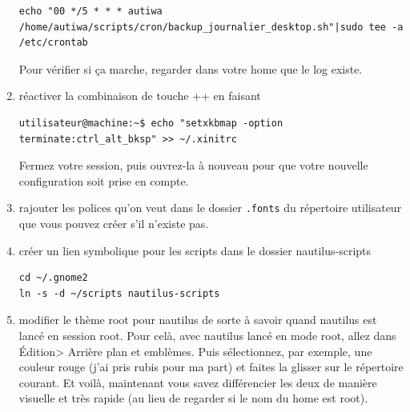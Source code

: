 \documentclass[a4paper,twoside]{article}
\begin{document}
\begin{enumerate}
\begin{verbatim}
echo "00 */5 * * * autiwa /home/autiwa/scripts/cron/backup_journalier_desktop.sh"|sudo tee -a /etc/crontab
\end{verbatim}


\begin{remarque}
Pour vérifier si ça marche, regarder dans votre home que le log existe.
\end{remarque}

\item réactiver la combinaison de touche ++ en faisant
\begin{verbatim}
utilisateur@machine:~$ echo "setxkbmap -option terminate:ctrl_alt_bksp" >> ~/.xinitrc
\end{verbatim}

Fermez votre session, puis ouvrez-la à nouveau pour que votre nouvelle configuration soit prise en compte.

%


\item rajouter les polices qu'on veut dans le dossier \texttt{.fonts} du répertoire utilisateur que vous pouvez créer s'il n'existe pas.

\item créer un lien symbolique pour les scripts dans le dossier nautilus-scripts
\begin{verbatim}
cd ~/.gnome2
ln -s -d ~/scripts nautilus-scripts
\end{verbatim}

\item modifier le thème root pour nautilus de sorte à savoir quand nautilus est lancé en session root. Pour celà, avec nautilus lancé en mode root, allez dans Édition> Arrière plan et emblèmes. Puis sélectionnez, par exemple, une couleur rouge (j'ai pris rubis pour ma part) et faites la glisser sur le répertoire courant. Et voilà, maintenant vous savez différencier les deux de manière visuelle et très rapide (au lieu de regarder si le nom du home est root).

\end{enumerate}
\end{document}

